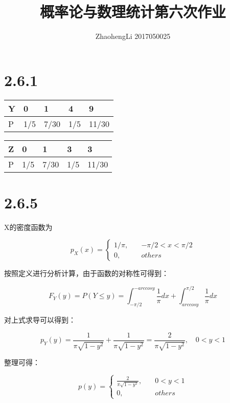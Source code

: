 \documentclass{article}
\title{概率论与数理统计第六次作业}
\author{ZhaohengLi 2017050025}
\begin{document}
\maketitle

\section{2.6.1}
\begin{table}[H]
\centering
\begin{tabular}{|l|l|l|l|l|}
\hline
Y & 0   & 1    & 4   & 9     \\ \hline
P & 1/5 & 7/30 & 1/5 & 11/30 \\ \hline
\end{tabular}
\end{table}
\begin{table}[H]
\centering
\begin{tabular}{|l|l|l|l|l|}
\hline
Z & 0   & 1    & 3   & 3     \\ \hline
P & 1/5 & 7/30 & 1/5 & 11/30 \\ \hline
\end{tabular}
\end{table}

\section{2.6.5}
X的密度函数为

\begin{equation}
p_X(x)=
\left\{
\begin{aligned}
1/\pi,\quad & -\pi/2<x<\pi/2 \\
0,\quad & others
\end{aligned}
\right.
\end{equation}


按照定义进行分析计算，由于函数的对称性可得到：

$$F_Y(y)=P(Y\leq y)=\int_{-\pi/2}^{-arccosy}\frac1\pi dx+\int^{\pi/2}_{arccosy}\frac1\pi dx$$

对上式求导可以得到：

$$p_Y(y)=\frac{1}{\pi\sqrt{1-y^2}}+\frac{1}{\pi\sqrt{1-y^2}}=\frac{2}{\pi\sqrt{1-y^2}},\quad 0<y<1$$

整理可得：

\begin{equation}
p(y)=\left\{
\begin{aligned}
\frac{2}{\pi\sqrt{1-y^2}},\quad & 0<y<1\\
0,\quad & others
\end{aligned}
\right.
\end{equation}
\end{document}
